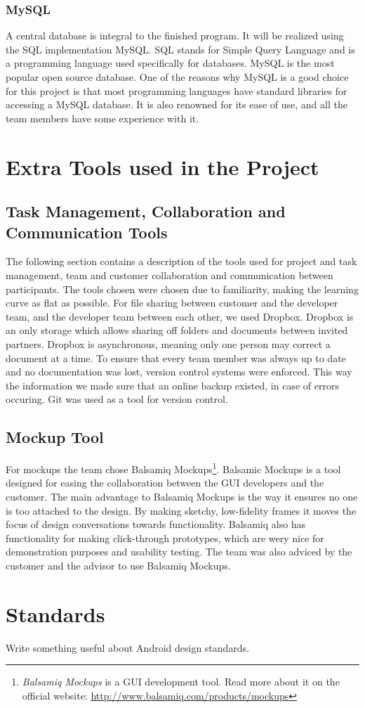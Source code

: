 \subsubsection{MySQL}
A central database is integral to the finished program. It will be realized using the SQL implementation MySQL. SQL stands for Simple Query Language and is a programming language used specifically for databases. MySQL is the most popular open source database\cite{mysqlmarketshare}. One of the reasons why MySQL is a good choice for this project is that most programming languages have standard libraries for accessing a MySQL database. It is also renowned for its ease of use, and all the team members have some experience with it.

\section{Extra Tools used in the Project}


\subsection{Task Management, Collaboration and Communication Tools}
The following section contains a description of the tools used for project and task management, team and customer collaboration and communication between participants. The tools chosen were chosen due to familiarity, making the learning curve as flat as possible. 
For file sharing between customer and the developer team, and the developer team between each other, we used Dropbox. Dropbox is an only storage which allows sharing off folders and documents between invited partners. Dropbox is asynchronous, meaning only one person may correct a document at a time.
To ensure that every team member was always up to date and no documentation was lost, version control systems were enforced. This way the information we made sure that an online backup existed, in case of errors occuring. Git was used as a tool for version control. 

\subsection{Mockup Tool}
For mockups the team chose Balsamiq Mockups\footnote{\emph{Balsamiq Mockups} is a GUI development tool. Read more about it on the official website: \href{http://www.balsamiq.com/products/mockups}{http://www.balsamiq.com/products/mockups}}. 
Balsamic Mockups is a tool designed for easing the collaboration between the GUI developers and the customer. The main advantage to Balsamiq Mockups is the way it ensures no one is too attached to the design.
By making sketchy, low-fidelity frames it moves the focus of design conversations towards functionality. Balsamiq also has functionality for making click-through prototypes, which are wery nice for demonstration purposes and usability testing.
The team was also adviced by the customer and the advisor to use Balsamiq Mockups.

\section{Standards}
Write something useful about Android design standards.